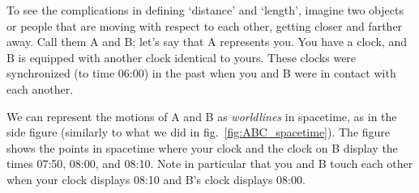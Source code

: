 \documentclass[a4paper,12pt,%
onecolumn,oneside,%
british%
]{memoir}
\renewcommand*{\|}[1][]{\nonscript\:#1\vert\nonscript\:\mathopen{}}
\newcommand*{\fig}{fig.}%
\begin{document}
To see the complications in defining \enquote*{distance} and \enquote*{length}, imagine two objects or people that are moving with respect to each other, getting closer and farther away. Call them A and B; let's say that A represents you. You have a clock, and B is equipped with another clock identical to yours. These clocks were synchronized (to time 06:00) in the past when you and B were in contact with each another.

%
%
We can represent the motions of A and B as \emph{worldlines} in spacetime, as in the side figure (similarly to what we did in \fig~\ref{fig:ABC_spacetime}). The figure shows the points in spacetime where your clock and the clock on B display the times 07:50, 08:00, and 08:10. Note in particular that you and B touch each other when your clock displays 08:10 and B's clock displays 08:00.
\end{document}
